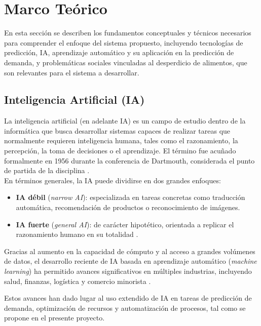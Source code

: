 \newpage %

\section{Marco Teórico}

En esta sección se describen los fundamentos conceptuales y técnicos necesarios para comprender el enfoque del sistema propuesto, incluyendo tecnologías de predicción, IA, aprendizaje automático y su aplicación en la predicción de demanda, y problemáticas sociales vinculadas al desperdicio de alimentos, que son relevantes para el sistema a desarrollar.


\subsection{Inteligencia Artificial (IA)}

La inteligencia artificial (en adelante IA) es un campo de estudio dentro de la informática que busca desarrollar sistemas capaces de realizar tareas que normalmente requieren inteligencia humana, tales como el razonamiento, la percepción, la toma de decisiones o el aprendizaje. El término fue acuñado formalmente en 1956 durante la conferencia de Dartmouth, considerada el punto de partida de la disciplina \parencite{mccarthy1955}.\\

En términos generales, la IA puede dividirse en dos grandes enfoques:

\begin{itemize}
    \item \textbf{IA débil} (\textit{narrow AI}): especializada en tareas concretas como traducción automática, recomendación de productos o reconocimiento de imágenes.
    
    \item \textbf{IA fuerte} (\textit{general AI}): de carácter hipotético, orientada a replicar el razonamiento humano en su totalidad \parencite{russell2021}.
\end{itemize}

Gracias al aumento en la capacidad de cómputo y al acceso a grandes volúmenes de datos, el desarrollo reciente de IA basada en aprendizaje automático (\textit{machine learning}) ha permitido avances significativos en múltiples industrias, incluyendo salud, finanzas, logística y comercio minorista \parencite{jordan2015}.

Estos avances han dado lugar al uso extendido de IA en tareas de predicción de demanda, optimización de recursos y automatización de procesos, tal como se propone en el presente proyecto.

